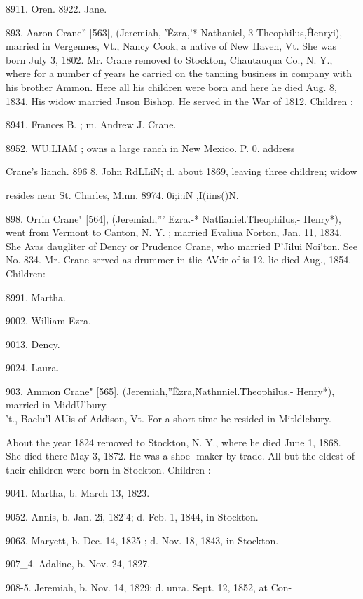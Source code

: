 8911. Oren. 
8922. Jane. 

893. Aaron Crane'' [563], (Jeremiah,-'\^ Ezra,'* Nathaniel, 3 
Theophilus,\^ Henryi), married in Vergennes, Vt., Nancy Cook, 
a native of New Haven, Vt. She was born July 3, 1802. Mr. 
Crane removed to Stockton, Chautauqua Co., N. Y., where for a 
number of years he carried on the tanning business in company 
with his brother Ammon. Here all his children were born and 
here he died Aug. 8, 1834. His widow married Jnson Bishop. 
He served in the War of 1812. Children : 

8941. Frances B. ; m. Andrew J. Crane. 

8952. WU.LIAM ; owns a large ranch in New Mexico. P. 0. address 

Crane's lianch. 
896  8. John RdLLiN; d. about 1869, leaving three children; widow 

resides near St. Charles, Minn. 
8974. 0i;i:iN ,I(iins()N. 

898. Orrin Crane" [564], (Jeremiah,''' Ezra.-* Natlianiel.\^ 
Theophilus,- Henry*), went from Vermont to Canton, N. Y. ; 
married Evaliua Norton, Jan. 11, 1834. She Avas daugliter of 
Dency or Prudence Crane, who married P'Jilui Noi'ton. See No. 
834. Mr. Crane served as drummer in tlie AV:ir of is 12. lie 
died Aug., 1854. Children: 

8991. Martha. 

9002. William Ezra. 

9013. Dency. 

9024. Laura. 

903. Ammon Crane" [565], (Jeremiah,''\^ Ezra,\^ Nathnniel.\^ 
Theophilus,- Henry*), married in MiddU'bury. \\'t., Baclu'l AUis 
of Addison, Vt. For a short time he resided in Mitldlebury. 




About the year 1824 removed to Stockton, N. Y., where he died 
June 1, 1868. She died there May 3, 1872. He was a shoe- 
maker by trade. All but the eldest of their children were born 
in Stockton. Children : 

9041. Martha, b. March 13, 1823. 

9052. Annis, b. Jan. 2i, 182'4; d. Feb. 1, 1844, in Stockton. 

 9063. Maryett, b. Dec. 14, 1825 ; d. Nov. 18, 1843, in Stockton. 

907\_4. Adaline, b. Nov. 24, 1827. 

908-5. Jeremiah, b. Nov. 14, 1829; d. unra. Sept. 12, 1852, at Con- 

